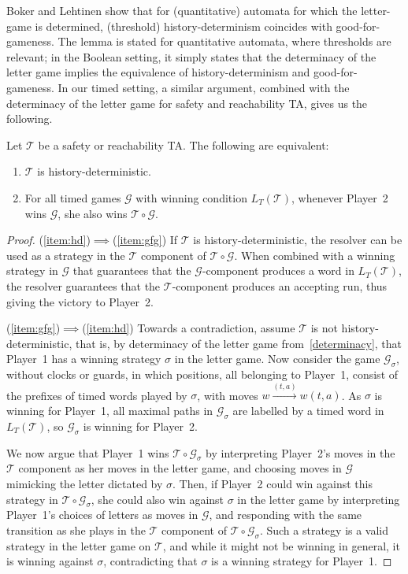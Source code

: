 \documentclass[10pt,a4paper]{amsart}
\theoremstyle{definition}
\numberwithin{equation}{section}
\newcommand{\T}{\mathcal{T}}
\newcommand{\gsgame}{\mathcal{G}}
\newcommand{\comp}[2]{#2\circ #1}
\newcommand{\strat}{\sigma}
\newcommand{\lang}{L_T}  %
\begin{document}
\medskip
Boker and Lehtinen \cite[Lemma 7]{BL21} show that for (quantitative) automata for which the letter-game is determined, (threshold) history-determinism coincides with good-for-gameness. The lemma is stated for quantitative automata, where thresholds are relevant; in the Boolean setting, it simply states that the determinacy of the letter game implies the equivalence of history-determinism and good-for-gameness. In our timed setting, a similar argument, combined with the determinacy of the letter game for safety and reachability TA, gives us the following.

\begin{theorem}\label{lem:gfg2hd}
	Let $\T$ be a safety or reachability TA. The following are equivalent: %
	\begin{enumerate}
		\item\label{item:hd} $\T$ is history-deterministic.
		\item\label{item:gfg} For all timed games $\gsgame$ with winning condition $\lang(\T)$, whenever  Player~2 wins $\gsgame$, she also wins $\comp{\gsgame}{\T}$.
	\end{enumerate} 

\end{theorem}

\begin{proof}
	(\ref{item:hd})$\implies$(\ref{item:gfg}) If $\T$ is history-deterministic, the resolver can be used as a strategy in the $\T$ component of $\comp{\gsgame}{\T}$. When combined with a winning strategy in $\gsgame$ that guarantees that the $\gsgame$-component produces a word in $\lang(\T)$, the resolver guarantees that the $\T$-component produces an accepting run, thus giving the victory to Player~2.
	
	(\ref{item:gfg})$\implies$(\ref{item:hd}) Towards a contradiction, assume $\T$ is not history-deterministic, that is, by determinacy of the letter game from~\cref{determinacy}, that Player~1 has a winning strategy $\strat$ in the letter game.
	Now consider the game $\gsgame_\strat$, without clocks or guards, in which positions, all belonging to Player~1, consist of the prefixes of timed words played by $\strat$, with moves $w\xrightarrow{(t,a)} w(t,a)$. %
	As $\strat$ is winning for Player~1, all maximal paths in $\gsgame_\strat$ are labelled by a timed word in $\lang(\T)$, so $\gsgame_\strat$ is winning for Player~2.
	
	We now argue that Player~1 wins $\comp{\gsgame_\strat}{\T}$ by interpreting Player~2's moves in the $\T$ component as her moves in the letter game, and choosing moves in $\gsgame$ mimicking the letter dictated by $\strat$. Then, if Player~2 could win against this strategy in $\comp{\gsgame_\strat}{\T}$, she could also win against $\strat$ in the letter game by interpreting Player~1's choices of letters as moves in $\gsgame$, and responding with the same transition as she plays in the $\T$ component of $\comp{\gsgame_\strat}{\T}$. Such a strategy is a valid strategy in the letter game on $\T$, and while it might not be winning in general, it is winning against $\strat$, contradicting that $\strat$ is a winning strategy for Player~1.
\end{proof}
\end{document}

